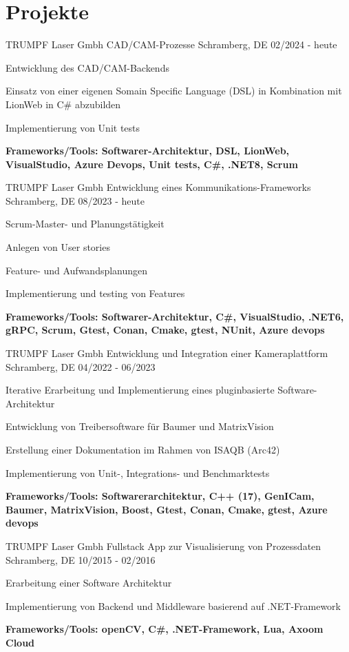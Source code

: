 \section{Projekte}

\cventry
{TRUMPF Laser Gmbh} %
{CAD/CAM-Prozesse} %
{Schramberg, DE} %
{02/2024 - heute} %
\begin{cvitems}
	\item Entwicklung des CAD/CAM-Backends
	\item Einsatz von einer eigenen Somain Specific Language (DSL) in Kombination mit LionWeb in C\# abzubilden
	\item Implementierung von Unit tests
	\item[] \textbf{Frameworks/Tools: Softwarer-Architektur, DSL, LionWeb, VisualStudio, Azure Devops, Unit tests, C\#, .NET8, Scrum}
\end{cvitems}

\cventry
{TRUMPF Laser Gmbh} %
{Entwicklung eines Kommunikations-Frameworks } %
{Schramberg, DE} %
{08/2023 - heute} %
\begin{cvitems}
	\item Scrum-Master- und Planungstätigkeit
	\item Anlegen von User stories
	\item Feature- und Aufwandsplanungen
	\item Implementierung und testing von Features
	\item[] \textbf{Frameworks/Tools: Softwarer-Architektur, C\#, VisualStudio, .NET6, gRPC, Scrum,  Gtest, Conan, Cmake, gtest, NUnit, Azure devops}
\end{cvitems}

\cventry
{TRUMPF Laser Gmbh} %
{Entwicklung und Integration einer Kameraplattform} %
{Schramberg, DE} %
{04/2022 - 06/2023} %
\begin{cvitems}
	\item Iterative Erarbeitung und Implementierung eines pluginbasierte Software-Architektur
	\item Entwicklung von Treibersoftware für Baumer und MatrixVision
	\item Erstellung einer Dokumentation im Rahmen von ISAQB (Arc42)
	\item Implementierung von Unit-, Integrations- und Benchmarktests
	\item[] \textbf{Frameworks/Tools: Softwarerarchitektur, C++ (17), GenICam, Baumer, MatrixVision, Boost, Gtest, Conan, Cmake, gtest, Azure devops}
\end{cvitems}

\cventry
{TRUMPF Laser Gmbh} %
{Fullstack App zur Visualisierung von Prozessdaten} %
{Schramberg, DE} %
{10/2015 - 02/2016} %
\begin{cvitems}
	\item Erarbeitung einer Software Architektur 
	\item Implementierung von Backend und Middleware basierend auf .NET-Framework
	\item[] \textbf{Frameworks/Tools: openCV, C\#, .NET-Framework, Lua, Axoom Cloud}
\end{cvitems}